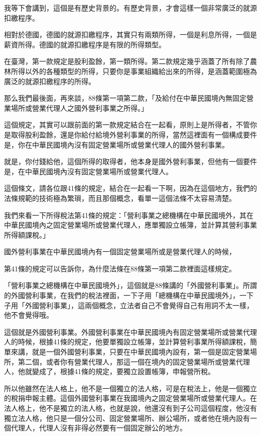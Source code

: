\documentclass[]{ctexbook}
\begin{document}
我等下會講到，這個是有歷史背景的。有歷史背景，才會這樣一個非常廣泛的就源扣繳程序。

相對於德國，德國的就源扣繳程序，其實只有兩類所得，一個是利息所得，一個是薪資所得。德國的就源扣繳程序是有限的所得類型。

在臺灣，第一款規定是股利盈餘，第一類所得。第二款規定幾乎涵蓋了所有除了農林所得以外的各種類型的所得，只要你是事業組織給出來的所得，是涵蓋範圍極為廣泛的就源扣繳程序的所得。

那么我們最後面，再來談，88條第一項第二款，「及給付在中華民國境內無固定營業場所或營業代理人之國外營利事業之所得。」

這個規定，其實可以跟前面的第一款規定結合在一起看，原則上是所得者，不管你是取得股利盈餘，還是你給付給境外營利事業的所得，當然這裡面有一個構成要件是，你在中華民國境內沒有固定營業場所或營業代理人的國外營利事業。

就是，你付錢給他，這個所得的取得者，他本身是國外營利事業，但他有一個要件是，在中華民國境內沒有固定營業場所或營業代理人。

這個條文，請各位跟41條的規定，結合在一起看一下啊，因為在這個地方，我們的法條規範的技術極為繁瑣，而且那個概念，看單一這個法條不太容易清楚。

我們來看一下所得稅法第41條的規定：「營利事業之總機構在中華民國境外，其在中華民國境內之固定營業場所或營業代理人，應單獨設立帳簿，並計算其營利事業所得額課稅。」

國外營利事業在中華民國境內有一個固定營業場所或是營業代理人的時候，

第41條的規定可以告訴你，為什麼法條在88條第一項第二款裡面這樣規定。

「營利事業之總機構在中華民國境外」，這個就是88條講的「外國營利事業」。所謂的外國營利事業，在我們的稅法裡面，一下子用「總機構在中華民國境外」，一下子用「外國營利事業」，這兩個概念，立法者自己不會覺得自己有用詞不太一樣，他不會覺得哦。

這個就是外國營利事業。外國營利事業在中華民國境內有固定營業場所或營業代理人的時候，根據41條的規定，他要單獨設立帳簿，並計算營利事業所得額課稅，簡單來講，就是一個外國營利事業，只要在中華民國境內設有，第一個是固定營業場所，第二個，或者你有營業代理人，那這一個在境內的固定營業場所或營業代理人，他就變成了，根據41條的規定，要獨立設置帳簿，申報營所稅。

所以他雖然在法人格上，他不是一個獨立的法人格，可是在稅法上，他是一個獨立的稅捐申報主體。這個外國營利事業在我國境內之固定營業場所或營業代理人。在法人格上，他不是獨立的法人格，也就是說，他還沒有到子公司這個程度，他沒有獨立法人格，他只是一個分公司、固定營業場所、辦公場所，或者他在境內設有一個代理人，代理人沒有非得必然要有一個固定辦公的地方。
\end{document}
